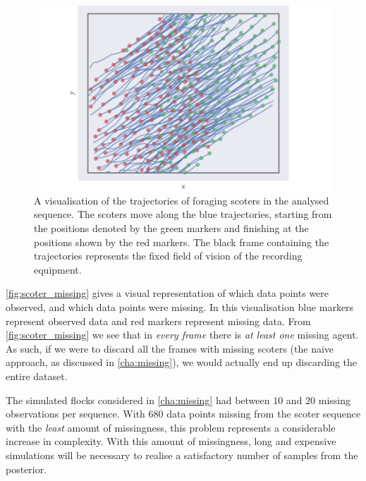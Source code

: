 \begin{figure}[tb]
  \includegraphics{data_00_traj.pdf}
  \caption{A visualisation of the trajectories of foraging scoters in the
    analysed sequence. The scoters move along the blue trajectories, starting
    from the positions denoted by the green markers and finishing at the
    positions shown by the red markers. The black frame containing the
    trajectories represents the fixed field of vision of the recording
    equipment.}
  \label{fig:scoter_traj}
\end{figure}

\cref{fig:scoter_missing} gives a visual representation of which data points
were observed, and which data points were missing. In this visualisation blue
markers represent observed data and red markers represent missing data. From
\cref{fig:scoter_missing} we see that in \emph{every frame} there is \emph{at
least one} missing agent. As such, if we were to discard all the frames with
missing scoters (the naive approach, as discussed in \cref{cha:missing}), we
would actually end up discarding the entire dataset.

The simulated flocks considered in \cref{cha:missing} had between $10$ and $20$
missing observations per sequence. With $680$ data points missing from the
scoter sequence with the \emph{least} amount of missingness, this problem
represents a considerable increase in complexity. With this amount of
missingness, long and expensive simulations will be necessary to realise a
satisfactory number of samples from the posterior.

